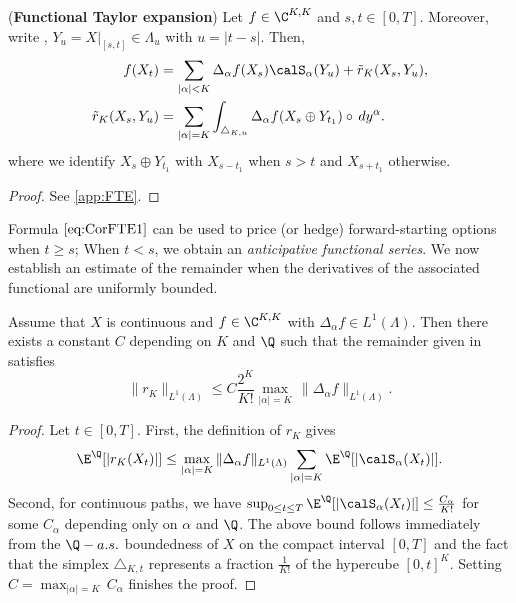 \begin{theorem}\textnormal{(\textbf{Functional  Taylor expansion})}
\label{thm:FTE}
 Let $f\in \C^{K,K}$ and $ s, t \in [0,T]$. Moreover, write ,  $Y_{u} = X |_{[s,t]} \in \Lambda_u$ with $u=|t-s|$. Then, 
\begin{align}
    f(X_{t}) &= \sum_{|\alpha|< K}  \Delta_{\alpha}f(X_s) \calS_{\alpha}(Y_u) + \tilde{r}_{K}(X_s,Y_u), \label{eq:CorFTE1}\\
        \tilde{r}_{K}(X_s,Y_u) &= \sum_{|\alpha| = K} \int_{\triangle_{K,u}} \Delta_{\alpha}f(X_{s}\oplus Y_{t_1}) \circ \, dy^{\alpha}. \label{eq:CorFTE2}
\end{align}
where we  identify $X_{s}\oplus Y_{t_1}$ with $X_{s-t_1}$ when $s>t$ and $X_{s+t_1}$ otherwise.
\end{theorem}

\begin{proof}
See \cref{app:FTE}.
\end{proof}

Formula $\eqref{eq:CorFTE1}$ can be used to price (or hedge) forward-starting options when $t\ge s$; 
When $t< s$, we obtain an \textit{anticipative functional series}. 
We now establish an estimate of the remainder when the derivatives of the associated functional are uniformly bounded. 

\begin{proposition}
Assume that $X$ is continuous and  $f \in \C^{K,K}$ with $\Delta_{\alpha}f \in L^{1}(\Lambda)$. Then there exists a constant $C$ depending on $K$ and $\Q$ such that the remainder given in  satisfies %
$$\lVert r_K \rVert_{L^{1}(\Lambda)} \le C \frac{2^K}{K!} \max_{|\alpha|=K}\,  \lVert \Delta_{\alpha}f \rVert_{L^{1}(\Lambda)}.$$

\begin{proof}
Let $t\in [0,T]$. First, the definition of $r_K$ gives
$$\E^{\Q}[|r_K(X_t)|] \le \max_{|\alpha|=K}\,  \lVert \Delta_{\alpha}f \rVert_{L^{1}(\Lambda)} \sum_{|\alpha|=K} \E^{\Q}[|\calS_{\alpha}(X_t)|].$$ Second, for continuous paths, we have  $\sup_{0\le t \le T}\E^{\Q}[|\calS_{\alpha}(X_t)|] \leq \frac{C_{\alpha}}{K!}$ for some $C_{\alpha}$ depending only on $\alpha$ and $\Q$. The above bound follows immediately from the  $\Q-a.s.$ boundedness of $X$ on the compact interval $[0,T]$ and the fact that the simplex $\triangle_{K,t}$ represents a fraction  $\frac{1}{K!}$ of the hypercube $[0,t]^K$. Setting $C= \max_{|\alpha|=K} \,C_{\alpha}$ finishes the proof.

\end{proof}
\end{proposition}
 

